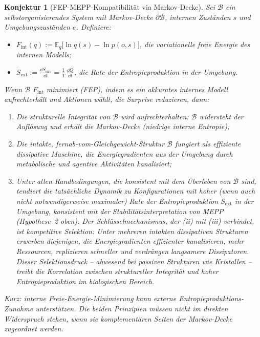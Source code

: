 \documentclass[12pt,a4paper]{article}
\newtheorem{conjecture}{Konjektur}
\theoremstyle{remark}
\begin{document}
\begin{conjecture}[FEP-MEPP-Kompatibilität via Markov-Decke]
\label{conj:fep-mepp}
Sei $\mathcal{B}$ ein selbstorganisierendes System mit Markov-Decke $\partial\mathcal{B}$, internen Zuständen $s$ und Umgebungszuständen $e$. Definiere:
\begin{itemize}
  \item $F_{\mathrm{int}}(q) :=
    \mathbb{E}_{q}\!\bigl[\ln q(s) - \ln p(o, s)\bigr]$,
    die variationelle freie Energie des internen Modells;
  \item $\dot{S}_{\mathrm{ext}} :=
    \frac{\dd S_{\mathrm{env}}}{\dd t} =
    \frac{1}{T}\,\frac{\dd Q}{\dd t}$,
    die Rate der Entropieproduktion in der Umgebung.
\end{itemize}
Wenn $\mathcal{B}$ $F_{\mathrm{int}}$ minimiert (FEP), indem es ein akkurates internes Modell aufrechterhält und Aktionen wählt, die Surprise reduzieren, dann:
\begin{enumerate}
  \item[\emph{(i)}] Die strukturelle Integrität von $\mathcal{B}$ wird aufrechterhalten: $\mathcal{B}$ widersteht der Auflösung und erhält die Markov-Decke (niedrige interne Entropie);
  \item[\emph{(ii)}] Die intakte, fernab-vom-Gleichgewicht-Struktur $\mathcal{B}$ fungiert als effiziente dissipative Maschine, die Energiegradienten aus der Umgebung durch metabolische und agentive Aktivitäten kanalisiert;
  \item[\emph{(iii)}] Unter allen Randbedingungen, die konsistent mit dem Überleben von $\mathcal{B}$ sind, tendiert die tatsächliche Dynamik zu Konfigurationen mit hoher (wenn auch nicht notwendigerweise maximaler) Rate der Entropieproduktion $\dot{S}_{\mathrm{ext}}$ in der Umgebung, konsistent mit der Stabilitätsinterpretation von MEPP (Hypothese~2 oben). Der Schlüsselmechanismus, der (ii) mit (iii) verbindet, ist \emph{kompetitive Selektion}: Unter mehreren intakten dissipativen Strukturen erwerben diejenigen, die Energiegradienten effizienter kanalisieren, mehr Ressourcen, replizieren schneller und verdrängen langsamere Dissipatoren. Dieser Selektionsdruck -- abwesend bei passiven Strukturen wie Kristallen -- treibt die Korrelation zwischen struktureller Integrität und hoher Entropieproduktion im biologischen Bereich.
\end{enumerate}
Kurz: \emph{interne Freie-Energie-Minimierung kann externe Entropieproduktions-Zunahme unterstützen}. Die beiden Prinzipien müssen nicht im direkten Widerspruch stehen, wenn sie komplementären Seiten der Markov-Decke zugeordnet werden.
\end{conjecture}
\end{document}
